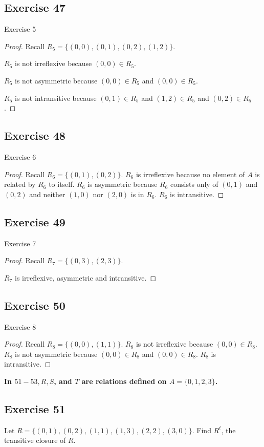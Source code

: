\documentclass[14pt]{extarticle}
\newcommand{\cy}{\color{cyan}}
\begin{document}
\subsection{Exercise 47}
Exercise 5
\begin{proof}
Recall \(R_5 = \{(0, 0), (0, 1), (0, 2), (1, 2)\}\).

\(R_5\) is not irreflexive because \((0,0) \in R_5\).

\(R_5\) is not asymmetric because \((0, 0) \in R_5\) and \((0, 0) \in R_5\).

\(R_5\) is not intransitive because \((0,1) \in R_5\) and \((1,2) \in R_5\) and \((0,2) \in R_5\).
\end{proof}

\subsection{Exercise 48}
Exercise 6
\begin{proof}
Recall \(R_6 = \{(0, 1), (0, 2)\}\). \(R_6\) is irreflexive because no element of \(A\) is related by \(R_6\) to 
itself. \(R_6\) is asymmetric because \(R_6\) consists only of \((0, 1)\) and \((0, 2)\) and neither \((1, 0)\) nor 
\((2, 0)\) is in \(R_6\). \(R_6\) is intransitive.
\end{proof}

\subsection{Exercise 49}
Exercise 7
\begin{proof}
Recall \(R_7 = \{(0, 3), (2, 3)\}\).

\(R_7\) is irreflexive, asymmetric and intransitive.
\end{proof}

\subsection{Exercise 50}
Exercise 8
\begin{proof}
Recall \(R_8 = \{(0, 0), (1, 1)\}\). \(R_8\) is not irreflexive because \((0,0) \in R_8\). \(R_8\) is not 
asymmetric because \((0,0) \in R_8\) and \((0,0) \in R_8\).
\(R_8\) is intransitive.
\end{proof}

{\bf \cy In \(51-53, R, S\), and \(T\) are relations defined on \(A = \{0, 1, 2, 3\}\).}

\subsection{Exercise 51}
Let \(R = \{(0, 1), (0, 2), (1, 1), (1, 3), (2, 2), (3, 0)\}\). Find \(R^t\), the transitive closure of \(R\).
\end{document}
